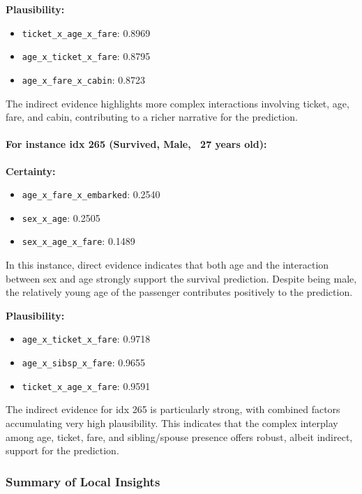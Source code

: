 \documentclass[acmlarge]{acmart}
\begin{document}
\textbf{Plausibility:}
\begin{itemize}
    \item \texttt{ticket_x_age_x_fare}: 0.8969
    \item \texttt{age\_x\_ticket\_x\_fare}: 0.8795
    \item \texttt{age\_x\_fare\_x\_cabin}: 0.8723
\end{itemize}
The indirect evidence highlights more complex interactions involving ticket, age, fare, and cabin, contributing to a richer narrative for the prediction.

\paragraph{For instance idx 265 (Survived, Male, ~27 years old):}  
\newline 
\textbf{Certainty:}
\begin{itemize}
    \item \texttt{age\_x\_fare\_x\_embarked}: 0.2540
    \item \texttt{sex\_x\_age}: 0.2505
    \item \texttt{sex\_x\_age\_x\_fare}: 0.1489
\end{itemize}
In this instance, direct evidence indicates that both age and the interaction between sex and age strongly support the survival prediction. Despite being male, the relatively young age of the passenger contributes positively to the prediction.

\textbf{Plausibility:}
\begin{itemize}
    \item \texttt{age\_x\_ticket\_x\_fare}: 0.9718
    \item \texttt{age\_x\_sibsp\_x\_fare}: 0.9655
    \item \texttt{ticket_x_age_x_fare}: 0.9591

\end{itemize}
The indirect evidence for idx 265 is particularly strong, with combined factors accumulating very high plausibility. This indicates that the complex interplay among age, ticket, fare, and sibling/spouse presence offers robust, albeit indirect, support for the prediction.

\subsubsection{Summary of Local Insights}
\end{document}
